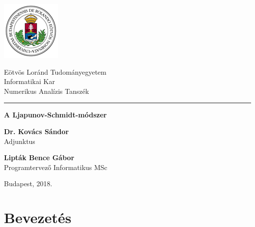 \documentclass[oneside, titlepage, 12pt, a4paper]{report}
\begin{document}
\begin{titlepage}

\begin{minipage}{0.40\linewidth}
\includegraphics[scale=0.8]{./abrak/elte_logo_szines.jpg}
\end{minipage}
\begin{minipage}{0.50\linewidth}
\begin{center}
Eötvös Loránd Tudományegyetem \\
Informatikai Kar \\
Numerikus Analízis Tanszék
\end{center}
\end{minipage}

\hrule
\vfill

\begin{center}
\Huge
\textbf{A Ljapunov-Schmidt-módszer}
\normalsize
\end{center}

\vfill

\begin{minipage}[t]{0.5\linewidth}
\begin{flushleft}
\textbf{Dr. Kovács Sándor} \\
Adjunktus
\end{flushleft}
\end{minipage}
\begin{minipage}[t]{0.5\linewidth}
\begin{flushright}
\textbf{Lipták Bence Gábor} \\
Programtervező Informatikus MSc
\end{flushright}
\end{minipage}

\vfill

\begin{center}
Budapest, 2018.
\end{center}

\end{titlepage}

\tableofcontents


\onehalfspacing
\chapter{Bevezetés}
\label{chap:Introduction}
\end{document}
